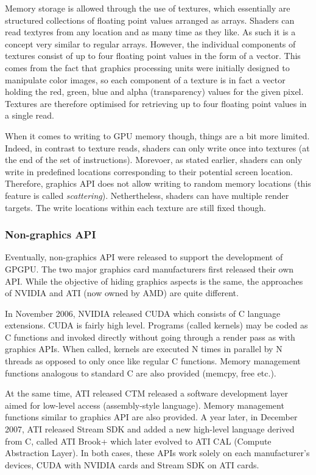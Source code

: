 Memory storage is allowed through the use of textures, which essentially are structured collections of floating point values arranged as arrays. Shaders can read textyres from any location and as many time as they like. As such it is a concept very similar to regular arrays. However, the individual components of textures consist of up to four floating point values in the form of a vector. This comes from the fact that graphics processing units were initially designed to manipulate color images, so each component of a texture is in fact a vector holding the red, green, blue and alpha (transparency) values for the given pixel. Textures are therefore optimised for retrieving up to four floating point values in a single read. 

When it comes to writing to GPU memory though, things are a bit more limited. Indeed, in contrast to texture reads, shaders can only write once into textures (at the end of the set of instructions). Morevoer, as stated earlier, shaders can only write in predefined locations corresponding to their potential screen location. Therefore, graphics API does not allow writing to random memory locations (this feature is called \emph{scattering}). Nethertheless, shaders can have multiple render targets. The write locations within each texture are still fixed though. 

		
		\subsubsection*{Non-graphics API}
Eventually, non-graphics API were released to support the development of GPGPU. The two major graphics card manufacturers first released their own API. While the objective of hiding graphics aspects is the same, the approaches of NVIDIA and ATI (now owned by AMD) are quite different. 

In November 2006, NVIDIA released CUDA which consists of C language extensions. CUDA is fairly high level. Programs (called kernels) may be coded as C functions and invoked directly without going through a render pass as with graphics APIs. When called, kernels are executed N times in parallel by N threads as opposed to only once like regular C functions. Memory management functions analogous to standard C are also provided (memcpy, free etc.). 

At the same time, ATI released CTM released a software development layer aimed for low-level access (assembly-style language). Memory management functions similar to graphics API are also provided. A year later, in December 2007, ATI released Stream SDK and added a new high-level language derived from C, called ATI Brook+ which later evolved to ATI CAL (Compute Abstraction Layer). In both cases, these APIs work solely on each manufacturer's devices, CUDA with NVIDIA cards and Stream SDK on ATI cards. 

